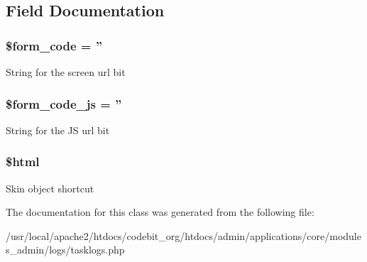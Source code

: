 \subsection{Field Documentation}
\hypertarget{classadmin__core__logs__tasklogs_af28aee726fa3eb6c355d08a2ab655e03}{
\subsubsection[{\$form\-\_\-code}]{\setlength{\rightskip}{0pt plus 5cm}\$form\-\_\-code = ''}}\label{classadmin__core__logs__tasklogs_af28aee726fa3eb6c355d08a2ab655e03}
String for the screen url bit \hypertarget{classadmin__core__logs__tasklogs_ac68fe8a02a2efd63c3271179f4b4fbb7}{
\subsubsection[{\$form\-\_\-code\-\_\-js}]{\setlength{\rightskip}{0pt plus 5cm}\$form\-\_\-code\-\_\-js = ''}}\label{classadmin__core__logs__tasklogs_ac68fe8a02a2efd63c3271179f4b4fbb7}
String for the J\-S url bit \hypertarget{classadmin__core__logs__tasklogs_a6f96e7fc92441776c9d1cd3386663b40}{
\subsubsection[{\$html}]{\setlength{\rightskip}{0pt plus 5cm}\$html}}\label{classadmin__core__logs__tasklogs_a6f96e7fc92441776c9d1cd3386663b40}
Skin object shortcut 

The documentation for this class was generated from the following file\-:\begin{DoxyCompactItemize}
\item 
/usr/local/apache2/htdocs/codebit\-\_\-org/htdocs/admin/applications/core/modules\-\_\-admin/logs/tasklogs.\-php\end{DoxyCompactItemize}
